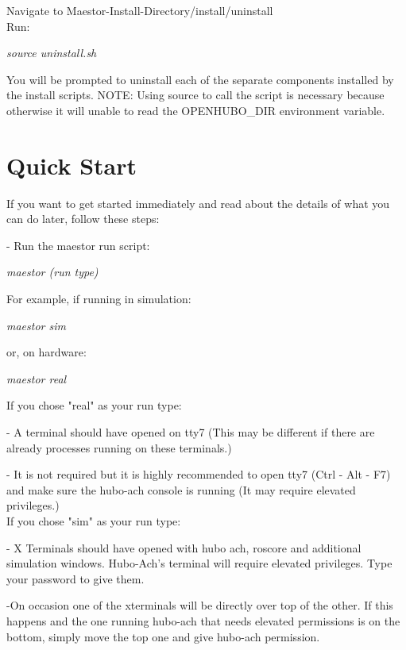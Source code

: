 \documentclass[12pt]{article}
\begin{document}
Navigate to Maestor-Install-Directory/install/uninstall\\
Run:
\begin{center}
	\textit{	source uninstall.sh}
\end{center}

You will be prompted to uninstall each of the separate components installed by the install scripts. 
NOTE: Using source to call the script is necessary because otherwise it will unable to read the OPENHUBO\_DIR environment variable.
\pagebreak
\section{Quick Start}

If you want to get started immediately and read about the details of what you can do later, follow these steps:

	- Run the maestor run script: 
			\begin{center}
				\textit{maestor (run type)}
			\end{center}
		For example, if running in simulation:
            \begin{center}
				\textit{maestor sim}
		    \end{center}
        or, on hardware:
            \begin{center}
				\textit{maestor real}
			\end{center}
		
\noindent If you chose "real" as your run type:
	
		- A terminal should have opened on tty7 (This may be different if there are already processes running on these terminals.)
		
		- It is not required but it is highly recommended to open tty7 (Ctrl - Alt - F7) and make sure the hubo-ach console is running (It may require elevated privileges.)\\

\noindent If you chose "sim" as your run type:
		
		- X Terminals should have opened with hubo ach, roscore and additional simulation windows. Hubo-Ach's terminal will require elevated privileges. Type your password to give them. 
		
		-On occasion one of the xterminals will be directly over top of the other. If this happens and the one running hubo-ach that needs elevated permissions is on the bottom, simply move the top one and give hubo-ach permission. \\
		
\end{document}

